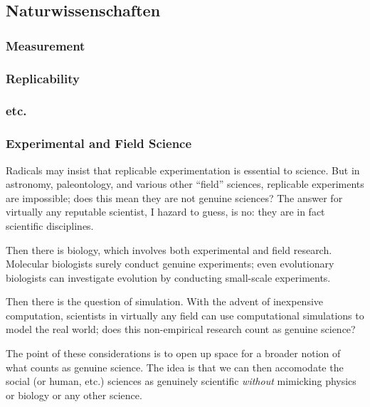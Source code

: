 \documentclass[11pt,twoside]{article}
\newcommand{\SR}{Survey Research}
\begin{document}
\subsection{Naturwissenschaften}

\begin{abstract}
  A concise survey of those features of ``hard'' science that figure
  prominently in the \SR{} literature.  One purpose is to clarify the
  ways in which \SR{} tries to mimic other sciences.
\end{abstract}

\subsubsection{Measurement}
\subsubsection{Replicability}
\subsubsection{etc.}

\subsubsection{Experimental and Field Science}

Radicals may insist that replicable experimentation is essential to
science.  But in astronomy, paleontology, and various other ``field''
sciences, replicable experiments are impossible; does this mean they
are not genuine sciences?  The answer for virtually any reputable
scientist, I hazard to guess, is no: they are in fact scientific
disciplines.

Then there is biology, which involves both experimental and field
research.  Molecular biologists surely conduct genuine experiments;
even evolutionary biologists can investigate evolution by conducting
small-scale experiments.

Then there is the question of simulation.  With the advent of
inexpensive computation, scientists in virtually any field can use
computational simulations to model the real world; does this
non-empirical research count as genuine science?

The point of these considerations is to open up space for a broader
notion of what counts as genuine science.  The idea is that we can
then accomodate the social (or human, etc.) sciences as genuinely
scientific \textit{without} mimicking physics or biology or any other
science.
\end{document}
